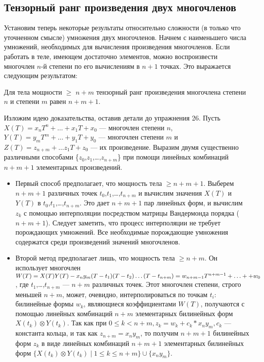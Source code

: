 \documentclass{mai_book}
\renewcommand{\le}{\leqslant}
\renewcommand{\ge}{\geqslant}
\begin{document}
\subsection{Тензорный ранг произведения двух многочленов}
Установим теперь некоторые результаты относительно сложности (в только что уточненном смысле) умножения двух многочленов. Начнем с наименьшего числа умножений, необходимых для вычисления произведения многочленов. Если работать в теле, имеющем достаточно элементов, можно воспроизвести многочлен $n$-й степени по его вычислениям в $n + 1$ точках. Это выражается следующим результатом:
\begin{predl}
Для тела мощности $\ge$ $n + m$ тензорный ранг произведения многочлена степени $n$ и степени $m$ равен $n + m + 1$.
  \end{predl}
\begin{myproof}
Изложим идею доказательства, оставив детали до упражнения 26. Пусть $X(T) = x_nT^n + \ldots + x_1T + x_0$ --- многочлен степени $n$, $Y(T) = y_mT^m + \ldots + y_1T + y_0$ --- многочлен степени $m$ и $Z(T) = z_{n+m} + \ldots z_1T + z_0$ --- их произведение. Выразим двумя существенно различными способами \{$z_0$,$z_1$,\ldots,$z_{n+m}$\} при помощи линейных комбинаций $n + m + 1$ элементарных произведений.
\begin{itemize}
\item{Первый способ предполагает, что мощность тела $\ge n + m + 1$. Выберем $n + m + 1$ различных точек $t_0$,$t_1$,\ldots,$t_{n+m}$ и вычислим значения $X(T)$ и $Y(T)$ в $t_0$,$t_1$,\ldots,$t_{n+m}$. Это дает $n + m + 1$ пар линейных форм, и вычислим $z_k$ с помощью интерполяции посредством матрицы Вандермонда порядка ($n + m + 1$). Следует заметить, что процесс интерполяции не требует порождающих умножений. Все необходимые порождающие умножения содержатся среди произведений значений многочленов.}
\item{Второй метод предполагает лишь, что мощность тела $\ge n + m$. Он использует многочлен $W(T) = X(T)Y(T) - x_ny_m(T - t_1)(T - t_2)\ldots(T - t_{n+m}) = w_{n+m-1}T^{n+m-1} + \ldots +\linebreak+w_0$, где $t_1$,\ldots,$t_{n+m}$ --- $n + m$ различных точек. Этот многочлен степени, строго меньшей $n + m$, может, очевидно, интерполироваться по точкам $t_i$: билинейные формы $w_k$, являющиеся коэффициентами $W(T)$, получаются с помощью линейных комбинаций $n + m$ элементарных билинейных форм $X(t_k) \otimes Y(t_k)$. Так как при $0 \le k < n+m, z_k = w_k + c_k * x_ny_m, c_k$ --- константа кольца, и так как $z_{n+m} = x_ny_m$, то получим $n + m + 1$ билинейных форм $z_k$ в виде линейных комбинаций $n + m + 1$ элементарных билинейных форм $\{X(t_k) \otimes Y(t_k) \mid 1 \le k \le n+m\} \cup \{x_ny_m\}$.}
\end{itemize}
\end{myproof}
\end{document}

